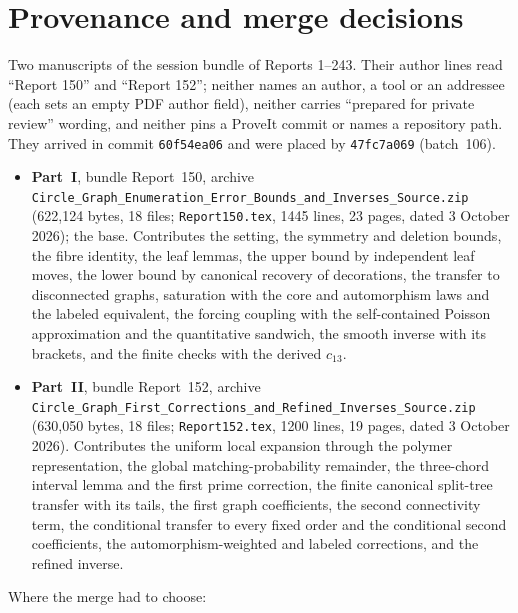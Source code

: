 \documentclass[11pt,letterpaper]{article}
\numberwithin{equation}{section}
\theoremstyle{definition}\newtheorem{definition}[theorem]{Definition}
\theoremstyle{remark}\newtheorem{remark}[theorem]{Remark}
\newcommand{\file}[1]{\nolinkurl{#1}}
\begin{document}
\section*{Provenance and merge decisions}\label{cgr:sec:provenance}
Two manuscripts of the session bundle of Reports 1--243. Their author lines read ``Report 150'' and ``Report 152''; neither names an author, a tool or an addressee (each sets an empty PDF author field), neither carries ``prepared for private review'' wording, and neither pins a ProveIt commit or names a repository path. They arrived in commit \texttt{60f54ea06} and were placed by \texttt{47fc7a069} (batch~106).
\begin{itemize}
\item \textbf{Part~I}, bundle Report~150, archive \file{Circle_Graph_Enumeration_Error_Bounds_and_Inverses_Source.zip} (622,124 bytes, 18 files; \file{Report150.tex}, 1445 lines, 23 pages, dated 3 October 2026); the base. Contributes the setting, the symmetry and deletion bounds, the fibre identity, the leaf lemmas, the upper bound by independent leaf moves, the lower bound by canonical recovery of decorations, the transfer to disconnected graphs, saturation with the core and automorphism laws and the labeled equivalent, the forcing coupling with the self-contained Poisson approximation and the quantitative sandwich, the smooth inverse with its brackets, and the finite checks with the derived $c_{13}$.
\item \textbf{Part~II}, bundle Report~152, archive \file{Circle_Graph_First_Corrections_and_Refined_Inverses_Source.zip} (630,050 bytes, 18 files; \file{Report152.tex}, 1200 lines, 19 pages, dated 3 October 2026). Contributes the uniform local expansion through the polymer representation, the global matching-probability remainder, the three-chord interval lemma and the first prime correction, the finite canonical split-tree transfer with its tails, the first graph coefficients, the second connectivity term, the conditional transfer to every fixed order and the conditional second coefficients, the automorphism-weighted and labeled corrections, and the refined inverse.
\end{itemize}
Where the merge had to choose:
\end{document}
